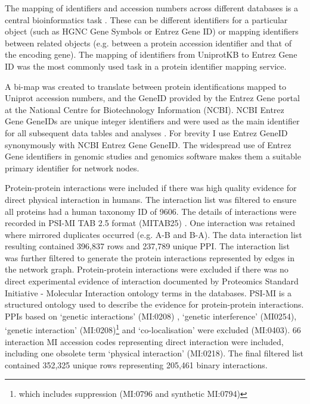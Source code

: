  The mapping of identifiers and accession numbers across different databases is a central bioinformatics task \cite{huang2011comprehensive}. These can be different identifiers for a particular object (such as HGNC Gene Symbols or Entrez Gene ID) or mapping identifiers between related objects (e.g. between a protein accession identifier and that of the encoding gene). The mapping of identifiers from UniprotKB to Entrez Gene ID was the most commonly used task in a protein identifier mapping service\cite{huang2011comprehensive}.
 
 A bi-map was created to translate between protein identifications mapped to Uniprot accession numbers\cite{uniprot2017uniprot}, and the GeneID provided by the Entrez Gene portal at the National Centre for Biotechnology Information (NCBI). NCBI Entrez Gene GeneIDs are unique integer identifiers and were used as the main identifier for all subsequent data tables and analyses \cite{maglott2005entrez}. For brevity I use Entrez GeneID synonymously with NCBI Entrez Gene GeneID.
 The widespread use of Entrez Gene identifiers in genomic studies and genomics software \cite{huang2011comprehensive} makes them a suitable primary identifier for network nodes.

Protein-protein interactions were included if there was high quality evidence for direct physical interaction in humans. The interaction list was filtered to ensure all proteins had a human taxonomy ID of 9606. The details of interactions were recorded in PSI-MI TAB 2.5 format (MITAB25)
\cite{isserlin2011biomolecular}\cite{heil2018systems}. One interaction was retained where mirrored duplicates occurred (e.g. A-B and B-A). The data interaction list resulting contained 396,837 rows and 237,789 unique PPI. 
The interaction list was further filtered to generate the protein interactions represented by edges in the network graph. Protein-protein interactions were excluded if there was no direct experimental evidence of interaction documented by Proteomics Standard Initiative - Molecular Interaction ontology terms in the databases. PSI-MI is a structured ontology used to describe the evidence for protein-protein interactions.\cite{isserlin2011biomolecular} PPIs based on `genetic interactions' (MI:0208) , `genetic interference' (MI0254), `genetic interaction' (MI:0208)\footnote{which includes suppression (MI:0796 and synthetic MI:0794)} and `co-localisation' were excluded (MI:0403). 66 interaction MI accession codes representing direct interaction were included, including one obsolete term `physical interaction' (MI:0218). The final filtered list contained 352,325 unique rows representing 205,461 binary interactions.


